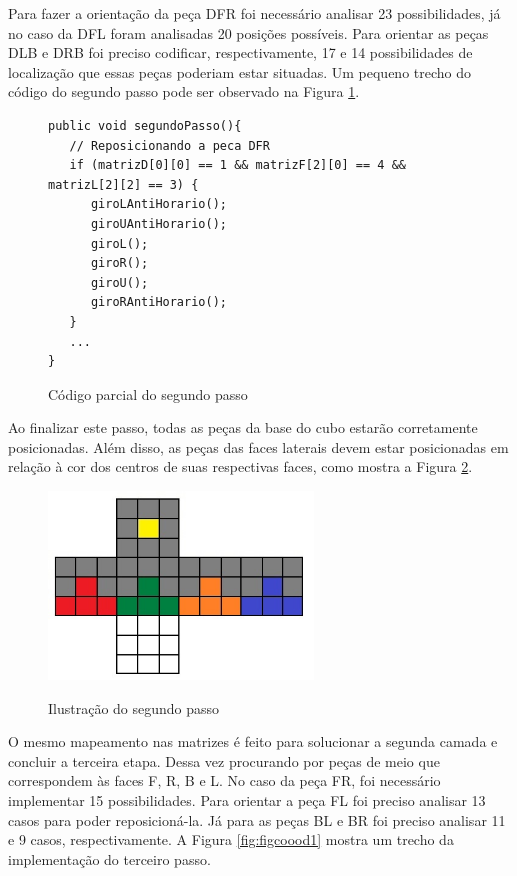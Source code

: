 Para fazer a orientação da peça DFR foi necessário analisar 23 possibilidades, já no caso da DFL foram analisadas 20 posições possíveis. Para orientar as peças DLB e DRB foi preciso codificar, respectivamente, 17 e 14 possibilidades de localização que essas peças poderiam estar situadas. Um pequeno trecho do código do segundo passo pode ser observado na Figura \ref{fig:figcodsds1}. 


\begin{figure}[!htb]
\begin{lstlisting}
public void segundoPasso(){
   // Reposicionando a peca DFR
   if (matrizD[0][0] == 1 && matrizF[2][0] == 4 && matrizL[2][2] == 3) {
      giroLAntiHorario();
      giroUAntiHorario();
      giroL();
      giroR();
      giroU();
      giroRAntiHorario();
   }
   ...
}
\end{lstlisting}
\caption{Código parcial do segundo passo}
\label{fig:figcodsds1}
\end{figure}

Ao finalizar este passo, todas as peças da base do cubo estarão  corretamente posicionadas. Além disso, as peças das faces laterais devem estar posicionadas em relação à cor dos centros de suas respectivas faces, como mostra a Figura \ref{fig:segundoPasso}.


\begin{figure}[!htb]
    \centering
    {
        \includegraphics[height=5cm]{imagens/segundopasso.jpg}
        \label{figFront}
    }
    
\caption{Ilustração do segundo passo}
\label{fig:segundoPasso}
\end{figure}

O mesmo mapeamento nas matrizes é feito para solucionar a segunda camada e concluir a terceira etapa. Dessa vez procurando por peças de meio que correspondem às faces F, R, B e L. No caso da peça FR, foi necessário implementar 15 possibilidades. Para orientar a peça FL foi preciso analisar 13 casos para poder reposicioná-la. Já para as peças BL e BR foi preciso analisar 11 e 9 casos, respectivamente. A Figura \ref{fig:figcoood1} mostra um trecho da implementação do terceiro passo.

